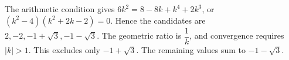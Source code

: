 The arithmetic condition gives $ 6k^2=8-8k+k^4+2k^3 $, or $(k^2-4)(k^2+2k-2)=0 $. Hence the candidates are $ 2,-2,-1+\sqrt3,-1-\sqrt3 $. The geometric ratio is $\dfrac{1}{k}$, and convergence requires $|k|>1 $. This excludes only $-1+\sqrt3 $. The remaining values sum to $\boxed{-1-\sqrt3}$.
